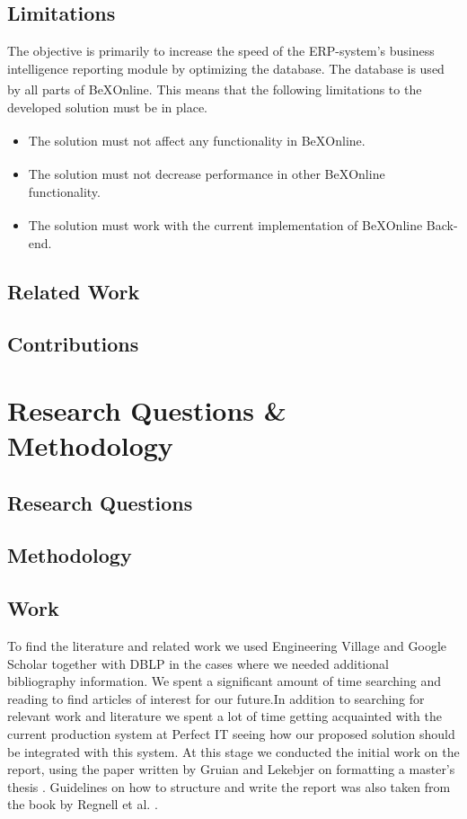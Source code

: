 \documentclass{cslthse-msc}
\newcommand{\bex}{BeX\textsuperscript{\textregistered}}
\begin{document}
\section{Limitations}
The objective is primarily to increase the speed of the ERP-system's business intelligence reporting module by optimizing the database. The database is used by all parts of \bex Online. This means that the following limitations to the developed solution must be in place.
\begin{itemize}
\item The solution must not affect any functionality in \bex Online.
\item The solution must not decrease performance in other \bex Online functionality.
\item The solution must work with the current implementation of \bex Online Back-end.
\end{itemize}

\section{Related Work}

\section{Contributions}

\chapter{Research Questions \& Methodology}

\section{Research Questions}

\section{Methodology}

\section{Work}
To find the literature and related work we used Engineering Village \cite{Enginvillage} and Google Scholar \cite{Googlescholar} together with DBLP \cite{DBLP} in the cases where we needed additional bibliography information. We spent a significant amount of time searching and reading to find articles of interest for our future.In addition to searching for relevant work and literature we spent a lot of time getting acquainted with the current production system at Perfect IT seeing how our proposed solution should be integrated with this system. At this stage we conducted the initial work on the report, using the paper written by Gruian and Lekebjer on formatting a master’s
thesis \cite{Reportmall}. Guidelines on how to structure and write the report was also taken from the book by Regnell et al. \cite{regnell}.
\end{document}
